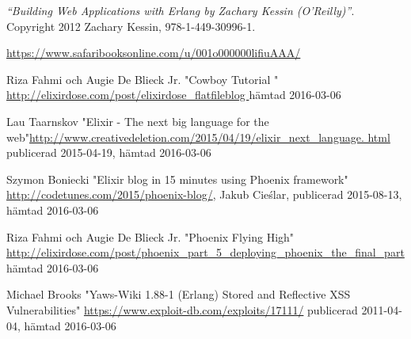 \documentclass[12pt]{article}
\begin{document}
\begin{thebibliography}{99}

 {\em “Building Web Applications with Erlang by Zachary Kessin (O’Reilly)”}.
 Copyright 2012 Zachary Kessin, 978-1-449-30996-1.

\url{https://www.safaribooksonline.com/u/001o000000lifiuAAA/}



Riza Fahmi och Augie De Blieck Jr.
 "Cowboy Tutorial " \url{http://elixirdose.com/post/elixirdose_flatfileblog }
hämtad 2016-03-06

 Lau Taarnskov "Elixir - The next big language for the web"\url{http://www.creativedeletion.com/2015/04/19/elixir_next_language.
html}
publicerad  2015-04-19,
hämtad 2016-03-06



 Szymon Boniecki "Elixir blog in 15 minutes using Phoenix framework" \url{http://codetunes.com/2015/phoenix-blog/}, Jakub Cieślar, publicerad 2015-08-13,
hämtad 2016-03-06

Riza Fahmi och Augie De Blieck Jr.
  "Phoenix Flying High" \url{http://elixirdose.com/post/phoenix_part_5_deploying_phoenix_the_final_part} 
hämtad 2016-03-06






 Michael Brooks "Yaws-Wiki 1.88-1 (Erlang) Stored and Reflective XSS Vulnerabilities"  \url{https://www.exploit-db.com/exploits/17111/}
publicerad 2011-04-04,
hämtad 2016-03-06



\end{thebibliography}
\end{document}
